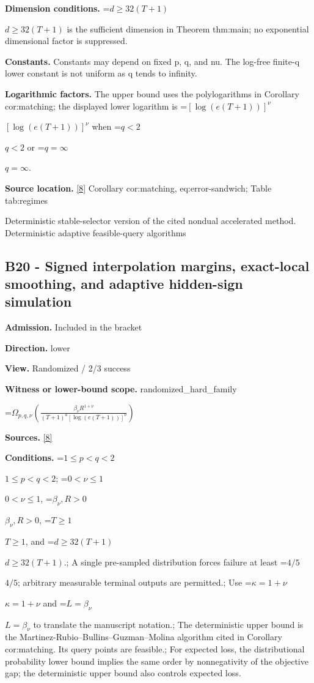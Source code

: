 \documentclass[10pt,a4paper]{article}
\newcommand{\AtlasMath}[1]{\par\begingroup\centering\setbox0=\hbox{$\displaystyle #1$}\ifdim\wd0>1.4\linewidth\typeout{ATLAS WIDE FORMULA: \the\wd0}\fi\ifdim\wd0>\linewidth\resizebox{\linewidth}{!}{\box0}\else\box0\fi\par\endgroup}
\newcommand{\AtlasInlineMath}[1]{\begingroup\setbox0=\hbox{$#1$}\ifdim\wd0>.4\linewidth\endgroup\AtlasMath{#1}\else\endgroup$#1$\fi}
\begin{document}
\textbf{Dimension conditions.} \AtlasInlineMath{d\ge32(T+1)} is the sufficient dimension in Theorem thm:main; no exponential dimensional factor is suppressed.



\textbf{Constants.} Constants may depend on fixed p, q, and nu. The log-free finite-q lower constant is not uniform as q tends to infinity.



\textbf{Logarithmic factors.} The upper bound uses the polylogarithms in Corollary cor:matching; the displayed lower logarithm is \AtlasInlineMath{[\log(e(T+1))]^\nu} when \AtlasInlineMath{q<2} or \AtlasInlineMath{q=\infty}.



\textbf{Source location.} \href{https://github.com/WU-Wendao/Colombo/blob/main/colombo_sensorium/Complexity_altas/data/sources/colombo/B1/manuscript.pdf}{[8]} Corollary cor:matching, eq:error-sandwich; Table tab:regimes



Deterministic stable-selector version of the cited nondual accelerated method. Deterministic adaptive feasible-query algorithms



\subsection{B20 - Signed interpolation margins, exact-local smoothing, and adaptive hidden-sign simulation}


\textbf{Admission.} Included in the bracket



\textbf{Direction.} lower



\textbf{View.} Randomized / 2/3 success



\textbf{Witness or lower-bound scope.} randomized\_hard\_family



\AtlasMath{\Omega_{p,q,\nu}\!\left(\frac{\beta_\nu R^{1+\nu}}{(T+1)^a[\log(e(T+1))]^\nu}\right)}


\textbf{Sources.} \href{https://github.com/WU-Wendao/Colombo/blob/main/colombo_sensorium/Complexity_altas/data/sources/colombo/B1/manuscript.pdf}{[8]}



\textbf{Conditions.} \AtlasInlineMath{1\le p<q<2}; \AtlasInlineMath{0<\nu\le1}, \AtlasInlineMath{\beta_\nu,R>0}, \AtlasInlineMath{T\ge1}, and \AtlasInlineMath{d\ge32(T+1)}.; A single pre-sampled distribution forces failure at least \AtlasInlineMath{4/5}; arbitrary measurable terminal outputs are permitted.; Use \AtlasInlineMath{\kappa=1+\nu} and \AtlasInlineMath{L=\beta_\nu} to translate the manuscript notation.; The deterministic upper bound is the Martinez-Rubio--Bullins--Guzman--Molina algorithm cited in Corollary cor:matching. Its query points are feasible.; For expected loss, the distributional probability lower bound implies the same order by nonnegativity of the objective gap; the deterministic upper bound also controls expected loss.
\end{document}
